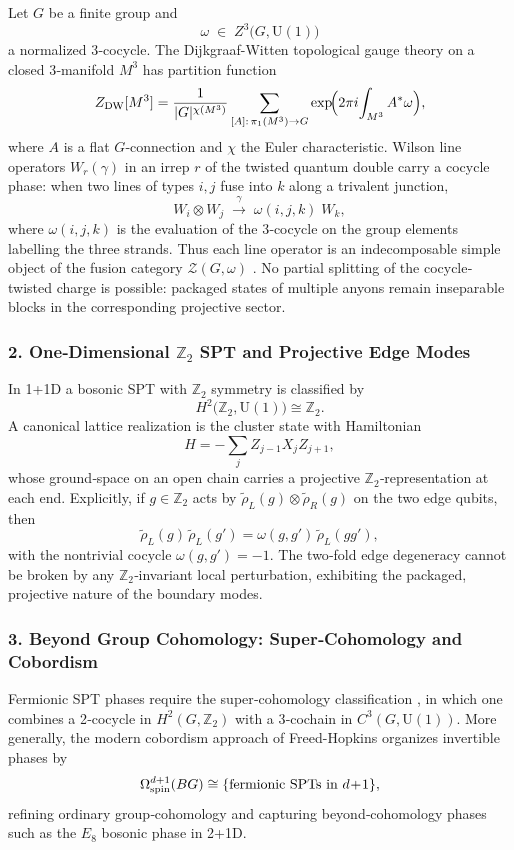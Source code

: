 \documentclass[12pt,a4paper]{article}
\begin{document}
Let $G$ be a finite group and
\[
\omega\;\in\;Z^3\bigl(G,\mathrm{U}(1)\bigr)
\]
a normalized 3‐cocycle.
The Dijkgraaf-Witten topological gauge theory on a closed 3‐manifold $M^3$ has partition function
\[
Z_{\rm DW}[M^3]
=\frac{1}{|G|^{\chi(M^3)}}\sum_{[A]:\,\pi_1(M^3)\to G}
\exp\!\Bigl(2\pi i\!\int_{M^3}A^*\omega\Bigr),
\]
where $A$ is a flat $G$‐connection and $\chi$ the Euler characteristic.
Wilson line operators $W_r(\gamma)$ in an irrep $r$ of the twisted quantum double carry a cocycle phase:
when two lines of types $i,j$ fuse into $k$ along a trivalent junction,
\[
W_i\otimes W_j
\;\xrightarrow{\;\gamma\;}\;
\omega(i,j,k)\;W_k,
\]
where $\omega(i,j,k)$ is the evaluation of the 3‐cocycle on the group elements labelling the three strands.
Thus each line operator is an indecomposable simple object of the fusion category $\mathcal{Z}(G,\omega)$ \cite{DijkgraafWitten1990,Etingof2005,Bakalov2001}.
No partial splitting of the cocycle‐twisted charge is possible:
packaged states of multiple anyons remain inseparable blocks in the corresponding projective sector.



\subsubsection*{2. One‐Dimensional $\mathbb Z_2$ SPT and Projective Edge Modes}


In 1+1D a bosonic SPT with $\mathbb Z_2$ symmetry is classified by
\[
H^2\bigl(\mathbb Z_2,\mathrm{U}(1)\bigr)\cong\mathbb Z_2.
\]
A canonical lattice realization is the cluster state with Hamiltonian
\[
H
=-\sum_j Z_{j-1}X_j Z_{j+1},
\]
whose ground‐space on an open chain carries a projective $\mathbb Z_2$‐representation at each end.
Explicitly, if $g\in\mathbb Z_2$ acts by
$\tilde{\rho}_L(g)\otimes\tilde{\rho}_R(g)$ on the two edge qubits, then
\[
\tilde{\rho}_L(g)\,\tilde{\rho}_L(g')
=\omega(g,g')\,\tilde{\rho}_L(gg'),
\]
with the nontrivial cocycle $\omega(g,g')=-1$.
The two‐fold edge degeneracy cannot be broken by any $\mathbb Z_2$‐invariant local perturbation, exhibiting the packaged, projective nature of the boundary modes.



\subsubsection*{3. Beyond Group Cohomology: Super‐Cohomology and Cobordism}
Fermionic SPT phases require the super‐cohomology classification \cite{GuWen2014,Kapustin2015}, in which one combines a 2‐cocycle in $H^2(G,\mathbb Z_2)$ with a 3‐cochain in $C^3(G,\mathrm{U}(1))$.
More generally, the modern cobordism approach of Freed-Hopkins \cite{FreedHopkins2016} organizes invertible phases by
\[
\Omega^{d+1}_{\rm spin}(BG)\cong\{\text{fermionic SPTs in }d\!+\!1\},
\]
refining ordinary group‐cohomology and capturing beyond‐cohomology phases such as the $E_8$ bosonic phase in 2+1D.
\end{document}
